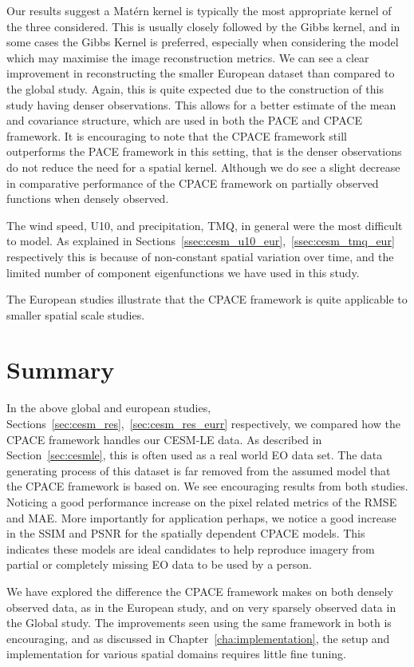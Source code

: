 Our results suggest a Mat\'ern kernel is typically the most appropriate kernel of the three considered.
This is usually closely followed by the Gibbs kernel, and in some cases the Gibbs Kernel is preferred, especially when considering the model which may maximise the image reconstruction metrics.
We can see a clear improvement in reconstructing the smaller European dataset than compared to the global study.
Again, this is quite expected due to the construction of this study having denser observations.
This allows for a better estimate of the  mean and covariance structure, which are used in both the PACE and CPACE framework.
It is encouraging to note that the CPACE framework still outperforms the PACE framework in this setting, that is the denser observations do not reduce the need for a spatial kernel.
Although we do see a slight decrease in comparative performance of the CPACE framework on partially observed functions when densely observed.

The wind speed, U10, and precipitation, TMQ, in general were the most difficult to model.
As explained in Sections~\ref{ssec:cesm_u10_eur},~\ref{ssec:cesm_tmq_eur} respectively this is because of non-constant spatial variation over time, and the limited number of component eigenfunctions we have used in this study.

The European studies illustrate that the CPACE framework is quite applicable to smaller spatial scale studies.


\section{Summary \label{sec:cesm_summ}}
In the above global and european studies, Sections~\ref{sec:cesm_res},~\ref{sec:cesm_res_eurr} respectively, we compared how the CPACE framework handles our CESM-LE data.
As described in Section~\ref{sec:cesmle}, this is often used as a real world  EO data set.
The data generating process of this dataset is far removed from the assumed model that the CPACE framework is based on.
We see encouraging results from both studies.
Noticing a good performance increase on the pixel related metrics of the RMSE and MAE.
More importantly for application perhaps, we notice a good increase in the SSIM and PSNR for the spatially dependent CPACE models.
This indicates these models are ideal candidates to help reproduce imagery from partial or completely missing EO data to be used by a person.

We have explored the difference the CPACE framework makes on both densely observed data, as in the European study, and on very sparsely observed data in the Global study.
The improvements seen using the same framework in both is encouraging, and as discussed in Chapter~\ref{cha:implementation}, the setup  and implementation for various spatial domains requires little fine tuning.

